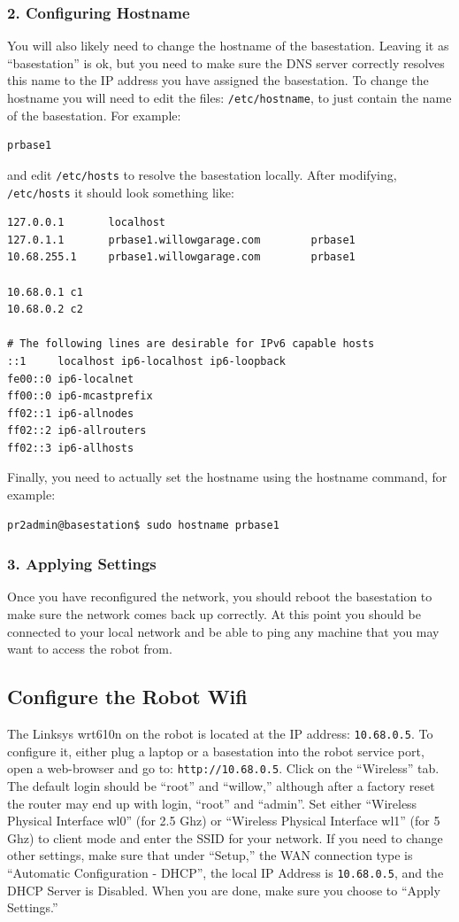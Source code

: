 \subsubsection{2. Configuring Hostname}
You will also likely need to change the hostname of the basestation.
Leaving it as ``basestation'' is ok, but you need to make sure the DNS
server correctly resolves this name to the IP address you have
assigned the basestation.  To change the hostname you will need to
edit the files: \texttt{/etc/hostname}, to just contain the name of
the basestation.  For example:
\begin{verbatim}
prbase1
\end{verbatim}
and edit \texttt{/etc/hosts} to resolve the basestation locally.
After modifying, \texttt{/etc/hosts} it should look something like:
\begin{verbatim}
127.0.0.1       localhost
127.0.1.1       prbase1.willowgarage.com        prbase1
10.68.255.1     prbase1.willowgarage.com        prbase1

10.68.0.1 c1
10.68.0.2 c2

# The following lines are desirable for IPv6 capable hosts
::1     localhost ip6-localhost ip6-loopback
fe00::0 ip6-localnet
ff00::0 ip6-mcastprefix
ff02::1 ip6-allnodes
ff02::2 ip6-allrouters
ff02::3 ip6-allhosts
\end{verbatim}
Finally, you need to actually set the hostname using the hostname command, for example:
\begin{verbatim}
pr2admin@basestation$ sudo hostname prbase1
\end{verbatim}

\subsubsection{3. Applying Settings}
Once you have reconfigured the network, you should reboot the
basestation to make sure the network comes back up correctly.  At this
point you should be connected to your local network and be able to
ping any machine that you may want to access the robot from.

\subsection{Configure the Robot Wifi}
The Linksys wrt610n on the robot is located at the IP address:
\texttt{10.68.0.5}. To configure it, either plug a laptop or a
basestation into the robot service port, open a web-browser and go to:
\texttt{http://10.68.0.5}.  Click on the ``Wireless'' tab.  The
default login should be ``root'' and ``willow,'' although after a
factory reset the router may end up with login, ``root'' and
``admin''.  Set either ``Wireless Physical Interface wl0'' (for 2.5
Ghz) or ``Wireless Physical Interface wl1'' (for 5 Ghz) to client mode
and enter the SSID for your network.  If you need to change other
settings, make sure that under ``Setup,'' the WAN connection type is
``Automatic Configuration - DHCP'', the local IP Address is
\texttt{10.68.0.5}, and the DHCP Server is Disabled.  When you are
done, make sure you choose to ``Apply Settings.''

